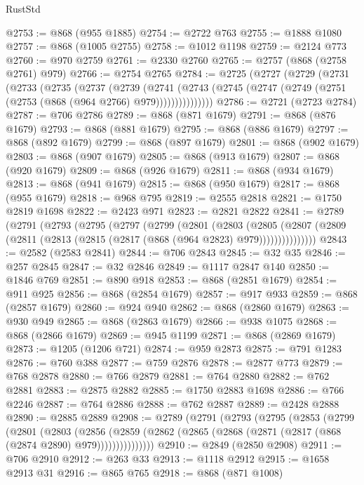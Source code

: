 \begin{lexlean}{RustStd}
\begin{coremodule}
@2753 := @868 (@955 @1885)
@2754 := @2722 @763
@2755 := @1888 @1080
@2757 := @868 (@1005 @2755)
@2758 := @1012 @1198
@2759 := @2124 @773
@2760 := @970 @2759
@2761 := @2330 @2760
@2765 := @2757 (@868 (@2758 @2761) @979)
@2766 := @2754 @2765
@2784 := @2725
    (@2727
      (@2729
        (@2731
          (@2733
            (@2735
              (@2737
                (@2739
                  (@2741
                    (@2743 (@2745 (@2747 (@2749 (@2751 (@2753 (@868 (@964 @2766) @979)))))))))))))))
@2786 := @2721 (@2723 @2784)
@2787 := @706 @2786
@2789 := @868 (@871 @1679)
@2791 := @868 (@876 @1679)
@2793 := @868 (@881 @1679)
@2795 := @868 (@886 @1679)
@2797 := @868 (@892 @1679)
@2799 := @868 (@897 @1679)
@2801 := @868 (@902 @1679)
@2803 := @868 (@907 @1679)
@2805 := @868 (@913 @1679)
@2807 := @868 (@920 @1679)
@2809 := @868 (@926 @1679)
@2811 := @868 (@934 @1679)
@2813 := @868 (@941 @1679)
@2815 := @868 (@950 @1679)
@2817 := @868 (@955 @1679)
@2818 := @968 @795
@2819 := @2555 @2818
@2821 := @1750 @2819 @1698
@2822 := @2423 @971
@2823 := @2821 @2822
@2841 := @2789
    (@2791
      (@2793
        (@2795
          (@2797
            (@2799
              (@2801
                (@2803
                  (@2805
                    (@2807 (@2809 (@2811 (@2813 (@2815 (@2817 (@868 (@964 @2823) @979)))))))))))))))
@2843 := @2582 (@2583 @2841)
@2844 := @706 @2843
@2845 := @32 @35
@2846 := @257 @2845
@2847 := @32 @2846
@2849 := @1117 @2847 @140
@2850 := @1846 @769
@2851 := @890 @918
@2853 := @868 (@2851 @1679)
@2854 := @911 @925
@2856 := @868 (@2854 @1679)
@2857 := @917 @933
@2859 := @868 (@2857 @1679)
@2860 := @924 @940
@2862 := @868 (@2860 @1679)
@2863 := @930 @949
@2865 := @868 (@2863 @1679)
@2866 := @938 @1075
@2868 := @868 (@2866 @1679)
@2869 := @945 @1199
@2871 := @868 (@2869 @1679)
@2873 := @1205 (@1206 @721)
@2874 := @959 @2873
@2875 := @791 @1283
@2876 := @760 @388
@2877 := @759 @2876
@2878 := @2877 @773
@2879 := @768 @2878
@2880 := @766 @2879
@2881 := @764 @2880
@2882 := @762 @2881
@2883 := @2875 @2882
@2885 := @1750 @2883 @1698
@2886 := @766 @2246
@2887 := @764 @2886
@2888 := @762 @2887
@2889 := @2428 @2888
@2890 := @2885 @2889
@2908 := @2789
    (@2791
      (@2793
        (@2795
          (@2853
            (@2799
              (@2801
                (@2803
                  (@2856
                    (@2859
                      (@2862 (@2865 (@2868 (@2871 (@2817 (@868 (@2874 @2890) @979)))))))))))))))
@2910 := @2849 (@2850 @2908)
@2911 := @706 @2910
@2912 := @263 @33
@2913 := @1118 @2912
@2915 := @1658 @2913 @31
@2916 := @865 @765
@2918 := @868 (@871 @1008)

\end{coremodule}
\end{lexlean}
